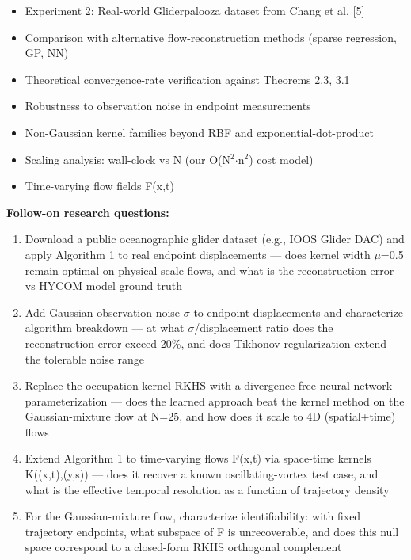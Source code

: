 \documentclass[11pt]{article}
\begin{document}
\begin{itemize}[leftmargin=1.4em,itemsep=0.2em,topsep=0.2em]
\item Experiment 2: Real-world Gliderpalooza dataset from Chang et al. [5]
\item Comparison with alternative flow-reconstruction methods (sparse regression, GP, NN)
\item Theoretical convergence-rate verification against Theorems 2.3, 3.1
\item Robustness to observation noise in endpoint measurements
\item Non-Gaussian kernel families beyond RBF and exponential-dot-product
\item Scaling analysis: wall-clock vs N (our O(N$^2$$\cdot$n$^2$) cost model)
\item Time-varying flow fields F(x,t)
\end{itemize}\noindent\textbf{Follow-on research questions:}
\begin{enumerate}[leftmargin=1.6em,itemsep=0.2em,topsep=0.2em,label=Q\arabic*.]
\item Download a public oceanographic glider dataset (e.g., IOOS Glider DAC) and apply Algorithm 1 to real endpoint displacements --- does kernel width $\mu$=0.5 remain optimal on physical-scale flows, and what is the reconstruction error vs HYCOM model ground truth
\item Add Gaussian observation noise $\sigma$ to endpoint displacements and characterize algorithm breakdown --- at what $\sigma$/displacement ratio does the reconstruction error exceed 20\%, and does Tikhonov regularization extend the tolerable noise range
\item Replace the occupation-kernel RKHS with a divergence-free neural-network parameterization --- does the learned approach beat the kernel method on the Gaussian-mixture flow at N=25, and how does it scale to 4D (spatial+time) flows
\item Extend Algorithm 1 to time-varying flows F(x,t) via space-time kernels K((x,t),(y,s)) --- does it recover a known oscillating-vortex test case, and what is the effective temporal resolution as a function of trajectory density
\item For the Gaussian-mixture flow, characterize identifiability: with fixed trajectory endpoints, what subspace of F is unrecoverable, and does this null space correspond to a closed-form RKHS orthogonal complement
\end{enumerate}
\end{document}
